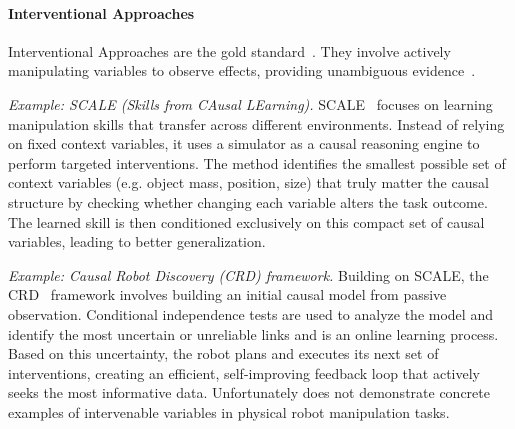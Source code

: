 \paragraph{Interventional Approaches}
Interventional Approaches are the gold standard~\cite{MndezMolina2022CausalDA}. They involve actively manipulating variables to observe effects, providing unambiguous evidence~\cite{Castri2025CausalityenhancedDF}.

\textit{Example: SCALE (Skills from CAusal LEarning).}
SCALE~\cite{Lee2023SCALECL} focuses on learning manipulation skills that transfer across different environments. Instead of relying on fixed context variables, it uses a simulator as a causal reasoning engine to perform targeted interventions. The method identifies the smallest possible set of context variables (e.g. object mass, position, size) that truly matter the causal structure by checking whether changing each variable alters the task outcome. The learned skill is then conditioned exclusively on this compact set of causal variables, leading to better generalization.


\textit{Example: Causal Robot Discovery (CRD) framework.}
Building on SCALE, the CRD~\cite{Castri2023FromCL} framework involves building an initial causal model from passive observation.
Conditional independence tests are used to analyze the model and identify the most uncertain or unreliable links and is an online learning process. 
Based on this uncertainty, the robot plans and executes its next set of interventions, creating an efficient, self-improving feedback loop that actively seeks the most informative data. Unfortunately \textcite{Castri2023FromCL} does not demonstrate concrete examples of intervenable variables in physical robot manipulation tasks.



